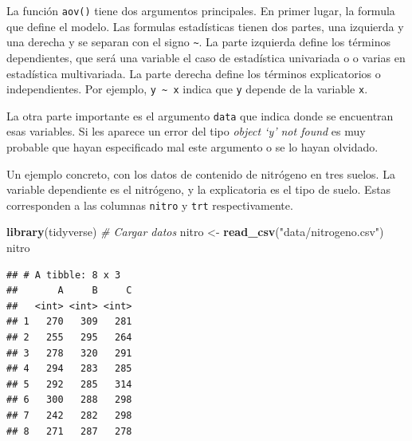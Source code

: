\documentclass[]{book}
\newenvironment{Shaded}{\begin{snugshade}}{\end{snugshade}}
\newcommand{\CommentTok}[1]{\textcolor[rgb]{0.56,0.35,0.01}{\textit{#1}}}
\newcommand{\KeywordTok}[1]{\textcolor[rgb]{0.13,0.29,0.53}{\textbf{#1}}}
\newcommand{\NormalTok}[1]{#1}
\newcommand{\OperatorTok}[1]{\textcolor[rgb]{0.81,0.36,0.00}{\textbf{#1}}}
\newcommand{\StringTok}[1]{\textcolor[rgb]{0.31,0.60,0.02}{#1}}
\theoremstyle{definition}
\theoremstyle{definition}
\theoremstyle{definition}
\theoremstyle{remark}
\begin{document}
La función \texttt{aov()} tiene dos argumentos principales. En primer
lugar, la formula que define el modelo. Las formulas estadísticas tienen
dos partes, una izquierda y una derecha y se separan con el signo
\texttt{\textasciitilde{}}. La parte izquierda define los términos
dependientes, que será una variable el caso de estadística univariada o
o varias en estadística multivariada. La parte derecha define los
términos explicatorios o independientes. Por ejemplo,
\texttt{y\ \textasciitilde{}\ x} indica que \texttt{y} depende de la
variable \texttt{x}.

La otra parte importante es el argumento \texttt{data} que indica donde
se encuentran esas variables. Si les aparece un error del tipo
\emph{object `y' not found} es muy probable que hayan especificado mal
este argumento o se lo hayan olvidado.

Un ejemplo concreto, con los datos de contenido de nitrógeno en tres
suelos. La variable dependiente es el nitrógeno, y la explicatoria es el
tipo de suelo. Estas corresponden a las columnas \texttt{nitro} y
\texttt{trt} respectivamente.

\begin{Shaded}
\begin{Highlighting}[]
\KeywordTok{library}\NormalTok{(tidyverse)}
\CommentTok{# Cargar datos}
\NormalTok{nitro <-}\StringTok{ }\KeywordTok{read_csv}\NormalTok{(}\StringTok{"data/nitrogeno.csv"}\NormalTok{)}
\NormalTok{nitro}
\end{Highlighting}
\end{Shaded}

\begin{verbatim}
## # A tibble: 8 x 3
##       A     B     C
##   <int> <int> <int>
## 1   270   309   281
## 2   255   295   264
## 3   278   320   291
## 4   294   283   285
## 5   292   285   314
## 6   300   288   298
## 7   242   282   298
## 8   271   287   278
\end{verbatim}

\begin{Shaded}
\end{Shaded}
\end{document}
